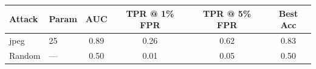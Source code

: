 \begin{tabular}{llcccc}
\toprule
Attack & Param & AUC & TPR @ 1\% FPR & TPR @ 5\% FPR & Best Acc \\
\midrule
jpeg & 25 & 0.89 & 0.26 & 0.62 & 0.83 \\
Random & — & 0.50 & 0.01 & 0.05 & 0.50 \\
\bottomrule
\end{tabular}

